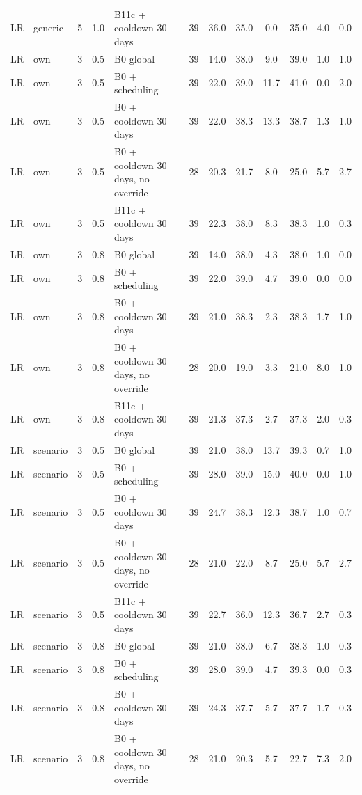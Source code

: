 \begin{longtable}{lllllccccccc}
LR & generic & 5 & 1.0 & B11c + cooldown 30 days & 39 & 36.0 & 35.0 & 0.0 & 35.0 & 4.0 & 0.0 \\
LR & own & 3 & 0.5 & B0 global & 39 & 14.0 & 38.0 & 9.0 & 39.0 & 1.0 & 1.0 \\
LR & own & 3 & 0.5 & B0 + scheduling & 39 & 22.0 & 39.0 & 11.7 & 41.0 & 0.0 & 2.0 \\
LR & own & 3 & 0.5 & B0 + cooldown 30 days & 39 & 22.0 & 38.3 & 13.3 & 38.7 & 1.3 & 1.0 \\
LR & own & 3 & 0.5 & B0 + cooldown 30 days, no override & 28 & 20.3 & 21.7 & 8.0 & 25.0 & 5.7 & 2.7 \\
LR & own & 3 & 0.5 & B11c + cooldown 30 days & 39 & 22.3 & 38.0 & 8.3 & 38.3 & 1.0 & 0.3 \\
LR & own & 3 & 0.8 & B0 global & 39 & 14.0 & 38.0 & 4.3 & 38.0 & 1.0 & 0.0 \\
LR & own & 3 & 0.8 & B0 + scheduling & 39 & 22.0 & 39.0 & 4.7 & 39.0 & 0.0 & 0.0 \\
LR & own & 3 & 0.8 & B0 + cooldown 30 days & 39 & 21.0 & 38.3 & 2.3 & 38.3 & 1.7 & 1.0 \\
LR & own & 3 & 0.8 & B0 + cooldown 30 days, no override & 28 & 20.0 & 19.0 & 3.3 & 21.0 & 8.0 & 1.0 \\
LR & own & 3 & 0.8 & B11c + cooldown 30 days & 39 & 21.3 & 37.3 & 2.7 & 37.3 & 2.0 & 0.3 \\
LR & scenario & 3 & 0.5 & B0 global & 39 & 21.0 & 38.0 & 13.7 & 39.3 & 0.7 & 1.0 \\
LR & scenario & 3 & 0.5 & B0 + scheduling & 39 & 28.0 & 39.0 & 15.0 & 40.0 & 0.0 & 1.0 \\
LR & scenario & 3 & 0.5 & B0 + cooldown 30 days & 39 & 24.7 & 38.3 & 12.3 & 38.7 & 1.0 & 0.7 \\
LR & scenario & 3 & 0.5 & B0 + cooldown 30 days, no override & 28 & 21.0 & 22.0 & 8.7 & 25.0 & 5.7 & 2.7 \\
LR & scenario & 3 & 0.5 & B11c + cooldown 30 days & 39 & 22.7 & 36.0 & 12.3 & 36.7 & 2.7 & 0.3 \\
LR & scenario & 3 & 0.8 & B0 global & 39 & 21.0 & 38.0 & 6.7 & 38.3 & 1.0 & 0.3 \\
LR & scenario & 3 & 0.8 & B0 + scheduling & 39 & 28.0 & 39.0 & 4.7 & 39.3 & 0.0 & 0.3 \\
LR & scenario & 3 & 0.8 & B0 + cooldown 30 days & 39 & 24.3 & 37.7 & 5.7 & 37.7 & 1.7 & 0.3 \\
LR & scenario & 3 & 0.8 & B0 + cooldown 30 days, no override & 28 & 21.0 & 20.3 & 5.7 & 22.7 & 7.3 & 2.0 \\

\end{longtable}
